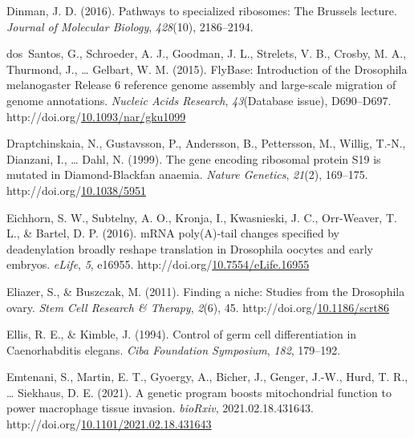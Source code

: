 \documentclass[12pt,oneside]{reedthesis}
\newlength{\cslhangindent}
\newenvironment{CSLReferences}[2] %
 {%
  \setlength{\parindent}{0pt}
  \ifodd #1 \everypar{\setlength{\hangindent}{\cslhangindent}}\ignorespaces\fi
  \ifnum #2 > 0
  \setlength{\parskip}{#2\baselineskip}
  \fi
 }%
 {}
\begin{document}
\begin{CSLReferences}{1}{0}
\leavevmode{}%
Dinman, J. D. (2016). Pathways to specialized ribosomes: The {Brussels} lecture. \emph{Journal of Molecular Biology}, \emph{428}(10), 2186--2194.

\leavevmode{}%
dos~Santos, G., Schroeder, A. J., Goodman, J. L., Strelets, V. B., Crosby, M. A., Thurmond, J., \ldots{} Gelbart, W. M. (2015). {FlyBase}: Introduction of the {Drosophila} melanogaster {Release} 6 reference genome assembly and large-scale migration of genome annotations. \emph{Nucleic Acids Research}, \emph{43}(Database issue), D690--D697. http://doi.org/\href{https://doi.org/10.1093/nar/gku1099}{10.1093/nar/gku1099}

\leavevmode{}%
Draptchinskaia, N., Gustavsson, P., Andersson, B., Pettersson, M., Willig, T.-N., Dianzani, I., \ldots{} Dahl, N. (1999). The gene encoding ribosomal protein {S19} is mutated in {Diamond-Blackfan} anaemia. \emph{Nature Genetics}, \emph{21}(2), 169--175. http://doi.org/\href{https://doi.org/10.1038/5951}{10.1038/5951}

\leavevmode{}%
Eichhorn, S. W., Subtelny, A. O., Kronja, I., Kwasnieski, J. C., Orr-Weaver, T. L., \& Bartel, D. P. (2016). {mRNA} poly({A})-tail changes specified by deadenylation broadly reshape translation in {Drosophila} oocytes and early embryos. \emph{eLife}, \emph{5}, e16955. http://doi.org/\href{https://doi.org/10.7554/eLife.16955}{10.7554/eLife.16955}

\leavevmode{}%
Eliazer, S., \& Buszczak, M. (2011). Finding a niche: Studies from the {Drosophila} ovary. \emph{Stem Cell Research \& Therapy}, \emph{2}(6), 45. http://doi.org/\href{https://doi.org/10.1186/scrt86}{10.1186/scrt86}

\leavevmode{}%
Ellis, R. E., \& Kimble, J. (1994). Control of germ cell differentiation in {Caenorhabditis} elegans. \emph{Ciba Foundation Symposium}, \emph{182}, 179--192.

\leavevmode{}%
Emtenani, S., Martin, E. T., Gyoergy, A., Bicher, J., Genger, J.-W., Hurd, T. R., \ldots{} Siekhaus, D. E. (2021). A genetic program boosts mitochondrial function to power macrophage tissue invasion. \emph{bioRxiv}, 2021.02.18.431643. http://doi.org/\href{https://doi.org/10.1101/2021.02.18.431643}{10.1101/2021.02.18.431643}


\end{CSLReferences}
\end{document}
